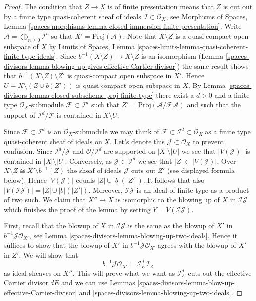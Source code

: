 \begin{proof}
The condition that $Z \to X$ is of finite presentation means that
$Z$ is cut out by a finite type quasi-coherent sheaf of ideals
$\mathcal{I} \subset \mathcal{O}_X$, see
Morphisms of Spaces, Lemma
\ref{spaces-morphisms-lemma-closed-immersion-finite-presentation}.
Write $\mathcal{A} = \bigoplus_{n \geq 0} \mathcal{I}^n$ so that
$X' = \underline{\text{Proj}}(\mathcal{A})$.
Note that $X \setminus Z$ is a quasi-compact open subspace of $X$ by
Limits of Spaces, Lemma
\ref{spaces-limits-lemma-quasi-coherent-finite-type-ideals}.
Since $b^{-1}(X \setminus Z) \to X \setminus Z$ is an isomorphism
(Lemma \ref{spaces-divisors-lemma-blowing-up-gives-effective-Cartier-divisor}) the same
result shows that
$b^{-1}(X \setminus Z) \setminus Z'$ is quasi-compact open subspace in $X'$.
Hence $U = X \setminus (Z \cup b(Z'))$ is quasi-compact open subspace in $X$.
By Lemma \ref{spaces-divisors-lemma-closed-subscheme-proj-finite-type}
there exist a $d > 0$ and a finite type
$\mathcal{O}_X$-submodule $\mathcal{F} \subset \mathcal{I}^d$ such
that $Z' = \underline{\text{Proj}}(\mathcal{A}/\mathcal{F}\mathcal{A})$
and such that the support of $\mathcal{I}^d/\mathcal{F}$ is contained
in $X \setminus U$.

\medskip\noindent
Since $\mathcal{F} \subset \mathcal{I}^d$ is an $\mathcal{O}_X$-submodule
we may think of $\mathcal{F} \subset \mathcal{I}^d \subset \mathcal{O}_X$
as a finite type quasi-coherent sheaf of ideals on $X$. Let's denote this
$\mathcal{J} \subset \mathcal{O}_X$ to prevent confusion. Since
$\mathcal{I}^d / \mathcal{J}$ and $\mathcal{O}/\mathcal{I}^d$ are
supported on $|X| \setminus |U|$ we see that $|V(\mathcal{J})|$ is contained
in $|X| \setminus |U|$. Conversely, as $\mathcal{J} \subset \mathcal{I}^d$
we see that $|Z| \subset |V(\mathcal{J})|$. Over
$X \setminus Z \cong X' \setminus b^{-1}(Z)$ the sheaf of ideals
$\mathcal{J}$ cuts out $Z'$ (see displayed formula below). Hence
$|V(\mathcal{J})|$ equals $|Z| \cup |b|(|Z'|)$. It follows that also
$|V(\mathcal{I}\mathcal{J})| = |Z| \cup |b|(|Z'|)$. Moreover,
$\mathcal{I}\mathcal{J}$ is an ideal of finite type as a product of two such.
We claim that $X'' \to X$ is isomorphic to the blowing up of $X$ in
$\mathcal{I}\mathcal{J}$ which finishes the proof of the lemma by setting
$Y = V(\mathcal{I}\mathcal{J})$.

\medskip\noindent
First, recall that the blowup of $X$ in $\mathcal{I}\mathcal{J}$
is the same as the blowup of $X'$ in $b^{-1}\mathcal{J} \mathcal{O}_{X'}$,
see Lemma \ref{spaces-divisors-lemma-blowing-up-two-ideals}.
Hence it suffices to show that the blowup of $X'$ in
$b^{-1}\mathcal{J} \mathcal{O}_{X'}$ agrees with the blowup of $X'$
in $Z'$. We will show that
$$
b^{-1}\mathcal{J} \mathcal{O}_{X'} = \mathcal{I}_E^d \mathcal{I}_{Z'}
$$
as ideal sheaves on $X''$. This will prove what we want as
$\mathcal{I}_E^d$ cuts out the effective Cartier divisor $dE$
and we can use Lemmas \ref{spaces-divisors-lemma-blow-up-effective-Cartier-divisor} and
\ref{spaces-divisors-lemma-blowing-up-two-ideals}.


\end{proof}
